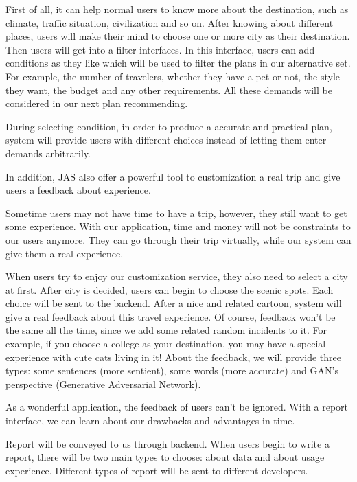 \documentclass[10pt]{article}
\begin{document}
First of all, it can help normal users to know more about the destination, such as climate, traffic situation, civilization and so on. After knowing about different places, users will make their mind to choose one or more city as their destination. Then users will get into a filter interfaces. In this interface, users can add conditions as they like which will be used to filter the plans in our alternative set. For example, the number of travelers, whether they have a pet or not, the style they want, the budget and any other requirements. All these demands will be considered in our next plan recommending.

During selecting condition, in order to produce a accurate and practical plan, system will provide users with different choices instead of letting them enter demands arbitrarily.

In addition, JAS also offer a powerful tool to customization a real trip and give users a feedback about experience.

Sometime users may not have time to have a trip, however, they still want to get some experience. With our application, time and money will not be constraints to our users anymore.
They can go through their trip virtually, while our system can give them a real experience.

When users try to enjoy our customization service, they also need to select a city at first. After city is decided, users can begin to choose the scenic spots. Each choice will be sent to the backend. After a nice and related cartoon, system will give a real feedback about this travel experience. Of course, feedback won’t be the same all the time, since we add some related random incidents to it. For example, if you choose a college as your destination, you may have a special experience with cute cats living in it! About the feedback, we will provide three types: some sentences (more sentient), some words (more accurate) and GAN’s perspective (Generative Adversarial Network). 

As a wonderful application, the feedback of users can’t be ignored. With a report interface, we can learn about our drawbacks and advantages in time.

Report will be conveyed to us through backend. When users begin to write a report, there will be two main types to choose: about data and about usage experience. Different types of report will be sent to different developers. 
\end{document}
